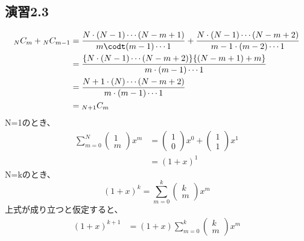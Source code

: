 \documentclass{bxjsarticle}
\begin{document}
\subsection*{演習2.3}
\begin{align*}
{}_N C_m+{}_N C_{m-1} &= \frac{N \cdot (N-1) \cdots (N-m+1)}{m \codt (m-1) \cdots 1} + \frac{N \cdot (N-1) \cdots (N-m+2)}{m-1 \cdot (m-2) \cdots 1} \\
                      &=\frac{\{N \cdot (N-1) \cdots (N-m+2)\}\{(N-m+1)+m\}}{m \cdot (m-1) \cdots 1} \\
                      &=\frac{N+1 \cdot (N) \cdots (N-m+2)}{m \cdot (m-1) \cdots 1} \\
                      &={}_{N+1} C_m
\end{align*}
N=1のとき、
\begin{align*}
\sum_{m=0}^N{\left(\begin{array}{ll} 1 \\ m \end{array} \right)x^m} &= \left(\begin{array}{ll} 1 \\ 0 \end{array} \right)x^0+\left(\begin{array}{ll} 1 \\ 1 \end{array} \right)x^1 \\
        &= (1+x)^1
\end{align*}
N=kのとき、
\[(1+x)^k = \sum_{m=0}^k{\left(\begin{array}{ll} k \\ m \end{array} \right)x^m}\]
上式が成り立つと仮定すると、
\begin{align*}
(1+x)^{k+1} &= (1+x)\sum_{m=0}^k{\left(\begin{array}{ll} k \\ m \end{array} \right)x^m}
\end{align*}
\end{document}
